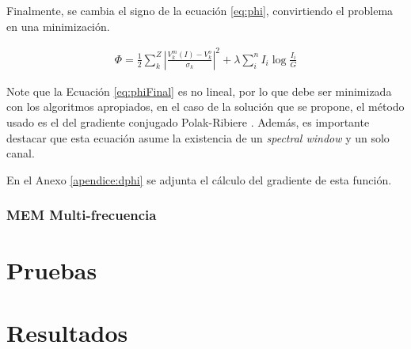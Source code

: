 Finalmente, se cambia el signo de la ecuación \ref{eq:phi}, convirtiendo el problema en una minimización.

\begin{align}
\label{eq:phiFinal}
 \Phi = \frac{1}{2}\sum_k^{Z}{{|\frac{V^m_k(I)-V^o_k}{\sigma_k}|^2} + \lambda \sum_i^{n}{I_i \log{\frac{I_i}{G}}}}
\end{align}


Note que la Ecuación \ref{eq:phiFinal} es no lineal, por lo que debe ser minimizada con los algoritmos apropiados, en el caso de la solución que se propone, el método usado es el del gradiente conjugado Polak-Ribiere \citep{polak}. Además, es importante destacar que esta ecuación asume la existencia de un \textit{spectral window} y un solo canal.

En el Anexo \ref{apendice:dphi} se adjunta el cálculo del gradiente de esta función.
\subsection{MEM Multi-frecuencia}












\chapter{Pruebas}
\label{cap:pruebas}

\chapter{Resultados}
\label{cap:resultados}
